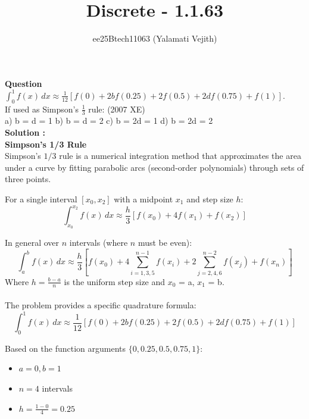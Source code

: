 \documentclass[a4paper,12pt]{article}
\theoremstyle{remark}
\renewcommand{\thefigure}{\arabic{figure}}
\begin{document}
\title{Discrete - 1.1.63}
\author{ee25Btech11063 (Yalamati Vejith) }
\maketitle
\renewcommand{\thefigure}{\theenumi}
\renewcommand{\thetable}{\theenumi}
\textbf{Question}\\
 $\int_{0}^{1} f(x) \, dx \approx \frac{1}{12} [f(0) + 2bf(0.25) + 2f(0.5) + 2df(0.75) + f(1)]$. \\
If used as Simpson's $\frac{1}{3}$ rule: \hfill (2007 XE) \\

\noindent a) b = d = 1 \hfill b) b = d = 2 \hfill c) b = 2d = 1 \hfill d) b = 2d = 2
\\ \textbf{Solution :}\\
\textbf{Simpson's 1/3 Rule}\\
Simpson's $1/3$ rule is a numerical integration method that approximates the area under a curve by fitting parabolic arcs (second-order polynomials) through sets of three points. 

For a single interval $[x_0, x_2]$ with a midpoint $x_1$ and step size $h$:
\begin{equation}
\int_{x_0}^{x_2} f(x) \, dx \approx \frac{h}{3} \left[ f(x_0) + 4f(x_1) + f(x_2) \right]
\end{equation}

In general  over $n$ intervals (where $n$ must be even):
\begin{equation}
\int_{a}^{b} f(x) \, dx \approx \frac{h}{3} \left[ f(x_0) + 4 \sum_{i=1,3,5}^{n-1} f(x_i) + 2 \sum_{j=2,4,6}^{n-2} f(x_j) + f(x_n) \right]
\end{equation}
Where $h = \frac{b-a}{n}$ is the uniform step size and $x_0$ = a, $x_1$ = b.\\ \\
The problem provides a specific quadrature formula:
\begin{equation}
\int_{0}^{1} f(x) \, dx \approx \frac{1}{12} \left[ f(0) + 2bf(0.25) + 2f(0.5) + 2df(0.75) + f(1) \right]
\label{eq:given}
\end{equation}

Based on the function arguments $\{0, 0.25, 0.5, 0.75, 1\}$:
\begin{itemize}
    \item $a = 0, b = 1$
    \item $n = 4$ intervals
    \item $h = \frac{1 - 0}{4} = 0.25$
\end{itemize}
\end{document}
